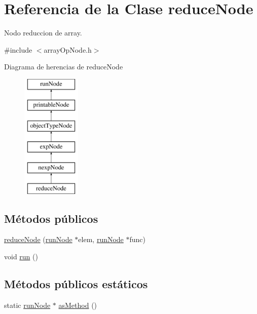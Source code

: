 \hypertarget{classreduceNode}{\section{Referencia de la Clase reduce\-Node}
\label{classreduceNode}
}


Nodo reduccion de array.  




{\ttfamily \#include $<$array\-Op\-Node.\-h$>$}

Diagrama de herencias de reduce\-Node\begin{figure}[H]
\begin{center}
\leavevmode
\includegraphics[height=6.000000cm]{classreduceNode}
\end{center}
\end{figure}
\subsection*{Métodos públicos}
\begin{DoxyCompactItemize}
\item 
\hyperlink{classreduceNode_ac4c8aa39ec6f6b76b09f7839c2cee7eb}{reduce\-Node} (\hyperlink{classrunNode}{run\-Node} $\ast$elem, \hyperlink{classrunNode}{run\-Node} $\ast$func)
\item 
void \hyperlink{classreduceNode_aab13f70c0ca5a00dec30f9ea1be93420}{run} ()
\end{DoxyCompactItemize}
\subsection*{Métodos públicos estáticos}
\begin{DoxyCompactItemize}
\item 
static \hyperlink{classrunNode}{run\-Node} $\ast$ \hyperlink{classreduceNode_ab81193bde5ae9ff6b2cce7fe4ff99b8f}{as\-Method} ()
\end{DoxyCompactItemize}


